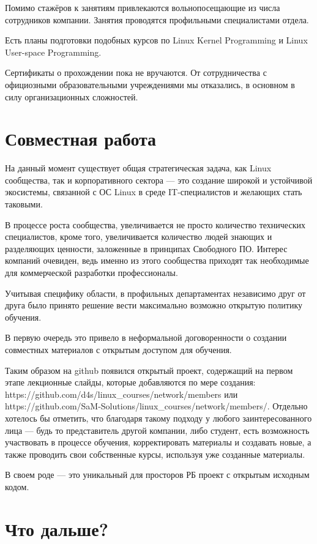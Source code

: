 \documentclass[10pt, a5paper]{article}
\begin{document}
Помимо стажёров к занятиям привлекаются вольнопосещающие из числа сотрудников компании. Занятия проводятся профильными специалистами отдела.

Есть планы подготовки подобных курсов по Linux Kernel Programming и Linux User-space Programming.

Сертификаты о прохождении пока не вручаются. От сотрудничества с официозными образовательными учреждениями мы отказались, в основном в силу организационных сложностей.

\section*{Совместная работа}

На данный момент существует общая стратегическая задача, как Linux сообщества, так и корпоративного сектора --- это создание широкой и устойчивой экосистемы, связанной с ОС Linux в среде IT-специалистов и желающих стать таковыми.

В процессе роста сообщества, увеличивается не просто количество технических специалистов, кроме того, увеличивается количество людей знающих и разделяющих ценности, заложенные в принципах Свободного ПО.
Интерес компаний очевиден, ведь  именно из этого сообщества приходят так необходимые для коммерческой разработки профессионалы.

Учитывая специфику области, в профильных департаментах независимо друг от друга было принято решение вести максимально возможно открытую политику обучения.

В первую очередь это привело в неформальной договоренности о создании совместных материалов с открытым доступом для обучения.

Таким образом на github появился открытый проект, содержащий на первом этапе лекционные слайды, которые добавляются по мере создания: https://github.com/d4s/linux\_courses/network/members или https://github.com/SaM-Solutions/linux\_courses/network/members/. Отдельно хотелось бы отметить, что благодаря такому подходу у любого заинтересованного лица --- будь то представитель другой компании, либо студент, есть возможность участвовать в процессе обучения, корректировать материалы и создавать новые, а также проводить свои собственные курсы, используя уже созданные материалы.

В своем роде --- это уникальный для просторов РБ проект с открытым исходным кодом.

\section*{Что дальше?}
\end{document}
